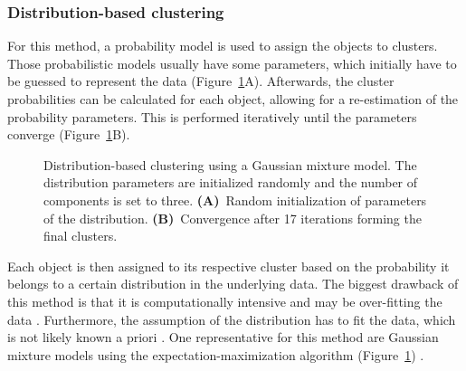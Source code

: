 \documentclass[12pt,a4paper,english]{article}
\begin{document}
\subsubsection*{Distribution-based clustering}
    For this method, a probability model is used to assign the objects to clusters. Those probabilistic models usually have some parameters, which initially have to be guessed to represent the data (Figure~\ref{img:distribution}A). Afterwards, the cluster probabilities can be calculated for each object, allowing for a re-estimation of the probability parameters. This is performed iteratively until the parameters converge (Figure~\ref{img:distribution}B). 
    	\begin{figure}[H]
    	\centering
		\vspace{-10pt}
    	\def\svgwidth{\textwidth}
    	
    	\caption[Distribution-based clustering using a Gaussian mixture model.]{Distribution-based clustering using a Gaussian mixture model. The distribution parameters are initialized randomly and the number of components is set to three. \textbf{(A)}~Random initialization of parameters of the distribution. \textbf{(B)}~Convergence after 17 iterations forming the final clusters.}
    	\label{img:distribution}
    \end{figure}
	Each object is then assigned to its respective cluster based on the probability it belongs to a certain distribution in the underlying data.
	The biggest drawback of this method is that it is computationally intensive and may be over-fitting the data \citep{distribution-based:04}. Furthermore, the assumption of the distribution has to fit the data, which is not likely known a priori \citep{distribution-based:03}. One representative for this method are Gaussian mixture models using the expectation-maximization algorithm (Figure~\ref{img:distribution}) \citep{distribution-based:ex-max:09}.
\end{document}

